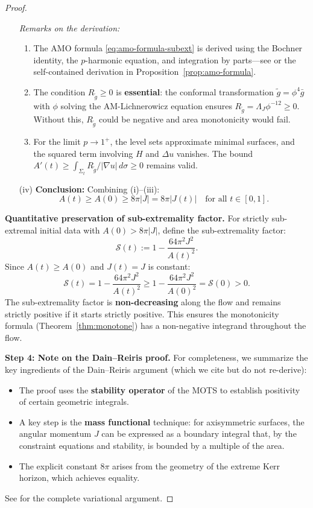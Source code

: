 \documentclass[12pt]{article}
\theoremstyle{plain}
\theoremstyle{definition}
\theoremstyle{remark}
\newcommand{\tg}{\tilde{g}}
\newcommand{\bg}{\bar{g}}
\begin{document}
\begin{proof}
\begin{enumerate}
    \textit{Remarks on the derivation:}
    \begin{enumerate}
        \item The AMO formula \eqref{eq:amo-formula-subext} is derived using the Bochner identity, the $p$-harmonic equation, and integration by parts---see \cite[Theorem 3.1]{amo2022} or the self-contained derivation in Proposition~\ref{prop:amo-formula}.
        \item The condition $R_{\tg} \geq 0$ is \textbf{essential}: the conformal transformation $\tg = \phi^4 \bg$ with $\phi$ solving the AM-Lichnerowicz equation ensures $R_{\tg} = \Lambda_J \phi^{-12} \geq 0$. Without this, $R_{\tg}$ could be negative and area monotonicity would fail.
        \item For the limit $p \to 1^+$, the level sets approximate minimal surfaces, and the squared term involving $H$ and $\Delta u$ vanishes. The bound $A'(t) \geq \int_{\Sigma_t} R_{\tg}/|\nabla u|\, d\sigma \geq 0$ remains valid.
    \end{enumerate}
    
    \item[(iv)] \textbf{Conclusion:} Combining (i)--(iii):
    \[
    A(t) \geq A(0) \geq 8\pi|J| = 8\pi|J(t)| \quad \text{for all } t \in [0, 1].
    \]
\end{enumerate}

\textbf{Quantitative preservation of sub-extremality factor.}
For strictly sub-extremal initial data with $A(0) > 8\pi|J|$, define the sub-extremality factor:
\[
\mathcal{S}(t) := 1 - \frac{64\pi^2 J^2}{A(t)^2}.
\]
Since $A(t) \geq A(0)$ and $J(t) = J$ is constant:
\[
\mathcal{S}(t) = 1 - \frac{64\pi^2 J^2}{A(t)^2} \geq 1 - \frac{64\pi^2 J^2}{A(0)^2} = \mathcal{S}(0) > 0.
\]
The sub-extremality factor is \textbf{non-decreasing} along the flow and remains strictly positive if it starts strictly positive. This ensures the monotonicity formula (Theorem~\ref{thm:monotone}) has a non-negative integrand throughout the flow.

\textbf{Step 4: Note on the Dain--Reiris proof.}
For completeness, we summarize the key ingredients of the Dain--Reiris argument (which we cite but do not re-derive):
\begin{itemize}
    \item The proof uses the \textbf{stability operator} of the MOTS to establish positivity of certain geometric integrals.
    \item A key step is the \textbf{mass functional} technique: for axisymmetric surfaces, the angular momentum $J$ can be expressed as a boundary integral that, by the constraint equations and stability, is bounded by a multiple of the area.
    \item The explicit constant $8\pi$ arises from the geometry of the extreme Kerr horizon, which achieves equality.
\end{itemize}
See \cite[Section 3]{dain2011} for the complete variational argument.
\end{proof}
\end{document}

